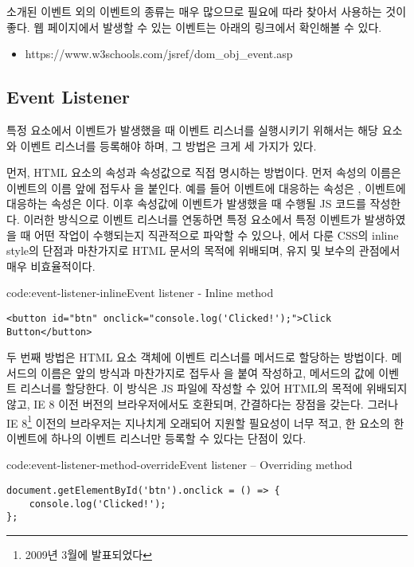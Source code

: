 소개된 이벤트 외의 이벤트의 종류는 매우 많으므로 필요에 따라 찾아서 사용하는 것이 좋다. 웹 페이지에서 발생할 수 있는 이벤트는 아래의 링크에서 확인해볼 수 있다.

\begin{itemize}
    \item https://www.w3schools.com/jsref/dom\_obj\_event.asp
\end{itemize}

\subsection*{Event Listener}

특정 요소에서 이벤트가 발생했을 때 이벤트 리스너를 실행시키기 위해서는 해당 요소와 이벤트 리스너를 등록해야 하며, 그 방법은 크게 세 가지가 있다.

먼저, HTML 요소의 속성과 속성값으로 직접 명시하는 방법이다. 먼저 속성의 이름은 이벤트의 이름 앞에 접두사 을 붙인다. 예를 들어  이벤트에 대응하는 속성은 ,  이벤트에 대응하는 속성은 이다. 이후 속성값에 이벤트가 발생했을 때 수행될 JS 코드를 작성한다. 이러한 방식으로 이벤트 리스너를 연동하면 특정 요소에서 특정 이벤트가 발생하였을 때 어떤 작업이 수행되는지 직관적으로 파악할 수 있으나, 에서 다룬 CSS의 inline style의 단점과 마찬가지로 HTML 문서의 목적에 위배되며, 유지 및 보수의 관점에서 매우 비효율적이다.

\begin{codeenv}{code:event-listener-inline}{Event listener - Inline method}\begin{verbatim}
<button id="btn" onclick="console.log('Clicked!');">Click Button</button>
\end{verbatim}
\end{codeenv}

두 번째 방법은 HTML 요소 객체에 이벤트 리스너를 메서드로 할당하는 방법이다. 메서드의 이름은 앞의 방식과 마찬가지로 접두사 을 붙여 작성하고, 메서드의 값에 이벤트 리스너를 할당한다. 이 방식은 JS 파일에 작성할 수 있어 HTML의 목적에 위배되지 않고, IE 8 이전 버전의 브라우저에서도 호환되며, 간결하다는 장점을 갖는다. 그러나 IE 8\footnote{2009년 3월에 발표되었다} 이전의 브라우저는 지나치게 오래되어 지원할 필요성이 너무 적고, 한 요소의 한 이벤트에 하나의 이벤트 리스너만 등록할 수 있다는 단점이 있다.

\begin{codeenv}{code:event-listener-method-override}{Event listener – Overriding method}\begin{verbatim}
document.getElementById('btn').onclick = () => {
    console.log('Clicked!');
};
\end{verbatim}
\end{codeenv}

